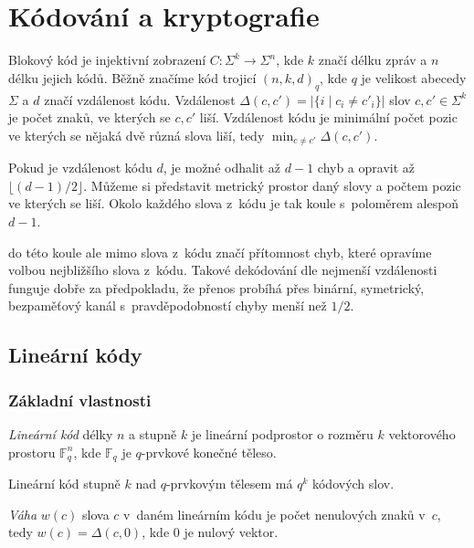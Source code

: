 \section{Kódování a kryptografie}

Blokový kód je injektivní zobrazení $C : \Sigma^k \to \Sigma^n$,
kde $k$ značí délku zpráv a $n$ délku jejich kódů.
Běžně značíme kód trojicí $(n,k,d)_q$, kde $q$ je velikost abecedy
$\Sigma$ a $d$ značí vzdálenost kódu. Vzdálenost
$\Delta(c, c') = \lvert \{ i \mid c_i \neq c'_i \} \rvert$
slov $c, c' \in \Sigma^k$ je počet znaků, ve kterých se $c, c'$
liší. Vzdálenost kódu je minimální počet pozic ve kterých se nějaká dvě
různá slova liší, tedy $\min_{c \neq c'} \Delta(c, c')$.

Pokud je vzdálenost kódu $d$, je možné odhalit až $d-1$ chyb
a opravit až $\lfloor (d-1) / 2 \rfloor$.
Můžeme si představit metrický prostor daný slovy a počtem pozic ve
kterých se liší. Okolo každého slova z~kódu je tak koule s~poloměrem
alespoň $d-1$.

 do této koule ale mimo slova z~kódu značí
přítomnost chyb, které opravíme volbou nejbližšího slova z~kódu. Takové
dekódování dle nejmenší vzdálenosti funguje dobře za předpokladu, že
přenos probíhá přes binární, symetrický, bezpaměťový kanál
s~pravděpodobností chyby menší než $1/2$.

\subsection{Lineární kódy}

\subsubsection{Základní vlastnosti}


\begin{definition}
    {\em Lineární kód} délky $n$ a stupně $k$
    je lineární podprostor o rozměru $k$
    vektorového prostoru $\mathbb{F}^n_q$,
    kde $\mathbb{F}_q$ je $q$-prvkové konečné těleso.
\end{definition}

Lineární kód stupně $k$ nad $q$-prvkovým tělesem má $q^k$ kódových slov.

\begin{definition}
    {\em Váha} $w(c)$ slova $c$ v~daném lineárním kódu je počet
    nenulových znaků v~$c$, tedy $w(c) = \Delta(c, 0)$, kde $0$ je
    nulový vektor.
\end{definition}


